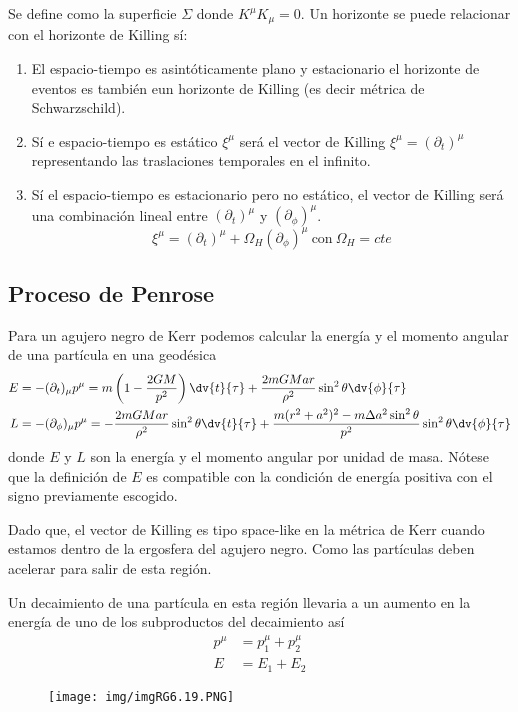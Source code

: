 \documentclass[../main]{subfiles}
\begin{document}
Se define como la superficie $\Sigma$ donde $K^{\mu} K_{\mu}=0$. Un horizonte se puede relacionar con el horizonte de Killing sí:
\begin{enumerate}
    \item El espacio-tiempo es asintóticamente plano y estacionario el horizonte de eventos es también eun horizonte de Killing (es decir métrica de Schwarzschild).
    \item Sí e espacio-tiempo es estático $\xi^{\mu}$ será el vector de Killing $\xi^{\mu}=(\partial_t)^{\mu}$ representando las traslaciones temporales en el infinito.
    \item Sí el espacio-tiempo es estacionario pero no estático, el vector de Killing será una combinación lineal entre $(\partial_t)^{\mu}$ y $(\partial_{\phi})^{\mu}$.
    \begin{equation}
        \xi^{\mu}=(\partial_t)^{\mu}+\Omega_H(\partial_{\phi})^{\mu} \ \text{con} \ \Omega_H=cte
    \end{equation}
\end{enumerate}

\subsection{Proceso de Penrose}

Para un agujero negro de Kerr podemos calcular la energía y el momento angular de una partícula en una geodésica
\begin{align}
    E&=-(\partial_t)_{\mu}p^{\mu}=m\left(1-\dfrac{2GM}{p^2}\right)\dv{t}{\tau}+\dfrac{2mGMar}{\rho^2}\sin^2 \theta \dv{\phi}{\tau} \\
    L&=-(\partial_{\phi})_{\mu} p^{\mu}=-\dfrac{2mGMar}{\rho^2}\sin^2 \theta \dv{t}{\tau}+\dfrac{m(r^2+a^2)^2-m\Delta a^2\sin^2 \theta}{p^2}\sin^2\theta \dv{\phi}{\tau}
\end{align}
donde $E$ y $L$ son la energía y el momento angular por unidad de masa. Nótese que la definición de $E$ es compatible con la condición de energía positiva con el signo previamente escogido.

Dado que, el vector de Killing es tipo space-like en la métrica de Kerr cuando estamos dentro de la ergosfera del agujero negro. Como las partículas deben acelerar para salir de esta región.

Un decaimiento de una partícula en esta región llevaria a un aumento en la energía de uno de los subproductos del decaimiento así 
\begin{align}
    p^{\mu}&=p^{\mu}_1+p^{\mu}_2 \\
    E&=E_1+E_2
\end{align}
\begin{figure}[h]
    \centering
    \texttt{[image: img/imgRG6.19.PNG]}
\end{figure}
\end{document}
